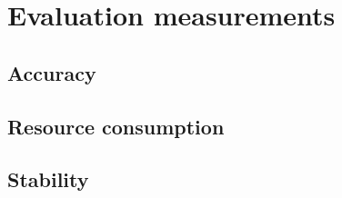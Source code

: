 \chapter{Evaluation measurements}
\section{Accuracy}
\section{Resource consumption}
\section{Stability}